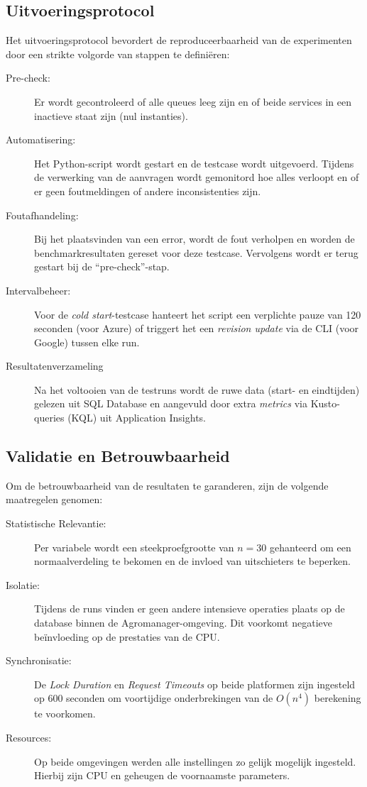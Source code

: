 \subsection{Uitvoeringsprotocol}

Het uitvoeringsprotocol bevordert de reproduceerbaarheid van de experimenten door een strikte volgorde van stappen te definiëren:

\begin{description}
    \item [Pre-check:] Er wordt gecontroleerd of alle queues leeg zijn en of beide services in een inactieve staat zijn (nul instanties).
    \item [Automatisering:] Het Python-script wordt gestart en de testcase wordt uitgevoerd. Tijdens de verwerking van de aanvragen wordt gemonitord hoe alles verloopt en of er geen foutmeldingen of andere inconsistenties zijn.
    \item [Foutafhandeling:] Bij het plaatsvinden van een error, wordt de fout verholpen en worden de benchmarkresultaten gereset voor deze testcase. Vervolgens wordt er terug gestart bij de ``pre-check''-stap.
    \item [Intervalbeheer:] Voor de \textit{cold start}-testcase hanteert het script een verplichte pauze van 120 seconden (voor Azure) of triggert het een \textit{revision update} via de CLI (voor Google) tussen elke run.
    \item [Resultatenverzameling] Na het voltooien van de testruns wordt de ruwe data (start- en eindtijden) gelezen uit SQL Database en aangevuld door extra \textit{metrics} via Kusto-queries (KQL) uit Application Insights.
\end{description}

\subsection{Validatie en Betrouwbaarheid}

Om de betrouwbaarheid van de resultaten te garanderen, zijn de volgende maatregelen genomen:

\begin{description}
    \item [Statistische Relevantie:] Per variabele wordt een steekproefgrootte van $n=30$ gehanteerd om een normaalverdeling te bekomen en de invloed van uitschieters te beperken.
    \item [Isolatie:] Tijdens de runs vinden er geen andere intensieve operaties plaats op de database binnen de Agromanager-omgeving. Dit voorkomt negatieve beïnvloeding op de prestaties van de CPU.
    \item [Synchronisatie:] De \textit{Lock Duration} en \textit{Request Timeouts} op beide platformen zijn ingesteld op 600 seconden om voortijdige onderbrekingen van de $O(n^4)$ berekening te voorkomen.
    \item [Resources:] Op beide omgevingen werden alle instellingen zo gelijk mogelijk ingesteld. Hierbij zijn CPU en geheugen de voornaamste parameters.
\end{description}


